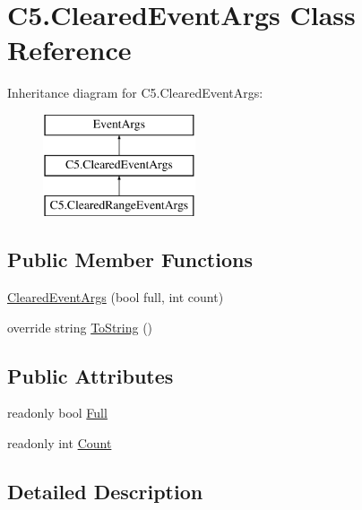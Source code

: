 \hypertarget{class_c5_1_1_cleared_event_args}{}\section{C5.\+Cleared\+Event\+Args Class Reference}
\label{class_c5_1_1_cleared_event_args}


 


Inheritance diagram for C5.\+Cleared\+Event\+Args\+:\begin{figure}[H]
\begin{center}
\leavevmode
\includegraphics[height=3.000000cm]{class_c5_1_1_cleared_event_args}
\end{center}
\end{figure}
\subsection*{Public Member Functions}
\begin{DoxyCompactItemize}
\item 
\hyperlink{class_c5_1_1_cleared_event_args_a5415fd8bfed551c7677984ec09395f44}{Cleared\+Event\+Args} (bool full, int count)
\item 
override string \hyperlink{class_c5_1_1_cleared_event_args_a01ef1a40e119365d8ff23c3d72602db9}{To\+String} ()
\end{DoxyCompactItemize}
\subsection*{Public Attributes}
\begin{DoxyCompactItemize}
\item 
readonly bool \hyperlink{class_c5_1_1_cleared_event_args_a2f772af2802fb799370ee6d351cb6d0b}{Full}
\item 
readonly int \hyperlink{class_c5_1_1_cleared_event_args_a5a635819ba820b9d202786554d84f737}{Count}
\end{DoxyCompactItemize}


\subsection{Detailed Description}




